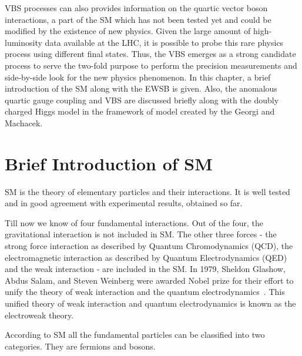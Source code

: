 VBS processes can also provides information on the quartic vector boson interactions, a part of the SM which has not been tested yet and could be modified by the existence of new physics. Given the large amount of  high-luminosity data available at the LHC, it is possible to probe this rare physics process using different final states. Thus, the VBS  emerges as a strong candidate process to serve the two-fold purpose to perform the precision measurements and side-by-side look for the new physics phenomenon.  
In this chapter, a brief introduction of the SM along with the EWSB is given. Also, the anomalous quartic gauge coupling and VBS are discussed briefly along with the doubly charged Higgs model in the framework of model created by the Georgi and Machacek.

\section{Brief Introduction of SM} %
\label{sec:brief_introduction_of_sm}
SM is the theory of elementary particles and their interactions. It is well tested and in good agreement with experimental results, obtained so far.

Till now we know of four fundamental interactions.
Out of the four, the gravitational interaction is not included in SM.
The other three forces - the strong force interaction as described by Quantum Chromodynamics (QCD), the electromagnetic interaction as described by Quantum Electrodynamics (QED) and the weak interaction - are included in the SM.
In 1979, Sheldon Glashow, Abdus Salam, and Steven Weinberg were awarded Nobel prize for their effort to unify the theory of weak interaction and the quantum electrodynamics~\cite{StandardModel67_1,StandardModel67_2}.
This unified theory of weak interaction and quantum electrodynamics is known as the electroweak theory.

According to SM all the fundamental particles can be classified into two categories. They are fermions and bosons.

